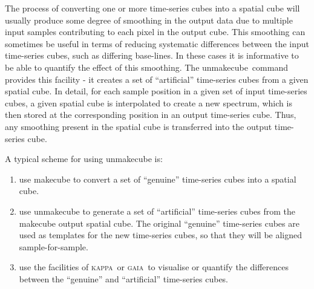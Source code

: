 \documentclass[twoside,11pt]{article}
\newcommand{\xref}[3]{#1}
\renewcommand{\_}{\texttt{\symbol{95}}}
\newcommand{\GAIA}{\textsc{gaia}}
\newcommand{\KAPPA}{\textsc{kappa}}
\newcommand{\task}[1]{\textsf{#1}}
\newcommand{\unmakecube}{\xref{\task{unmakecube}}{sun258}{UNMAKECUBE}}
\begin{document}
The process of converting one or more time-series cubes into a spatial
cube will usually produce some degree of smoothing in the output data due
to multiple input samples contributing to each pixel in the output cube.
This smoothing can sometimes be useful in terms of reducing systematic
differences between the input time-series cubes, such as differing
base-lines. In these cases it is informative to be able to quantify the
effect of this smoothing. The \unmakecube\ command provides this facility
- it creates a set of ``artificial'' time-series cubes from a given
spatial cube. In detail, for each sample position in a given set of input
time-series cubes, a given spatial cube is interpolated to create a new
spectrum, which is then stored at the corresponding position in an output
time-series cube. Thus, any smoothing present in the spatial cube is
transferred into the output time-series cube.

A typical scheme for using unmakecube is:

\begin{enumerate}
\item use makecube to convert a set of ``genuine'' time-series cubes into
a spatial cube.
\item use unmakecube to generate a set of ``artificial'' time-series cubes
from the makecube output spatial cube. The original ``genuine''
time-series cubes are used as templates for the new time-series cubes, so
that they will be aligned sample-for-sample.
\item use the facilities of \KAPPA\ or \GAIA\ to visualise or quantify the
differences between the ``genuine'' and ``artificial'' time-series cubes.
\end{enumerate}
\end{document}
